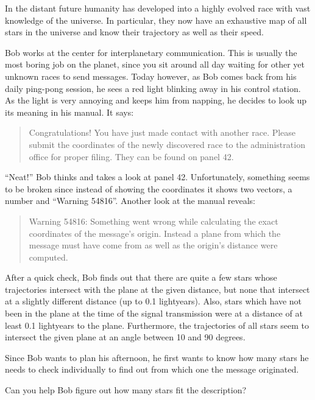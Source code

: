 
In the distant future humanity has developed into a highly evolved race with vast knowledge of the universe. In particular, they now have an exhaustive map of all stars in the universe and know their trajectory as well as their speed.

Bob works at the center for interplanetary communication. This is usually the most boring job on the planet, since you sit around all day waiting for other yet unknown races to send messages. Today however, as Bob comes back from his daily ping-pong session, he sees a red light blinking away in his control station. As the light is very annoying and keeps him from napping, he decides to look up its meaning in his manual. It says:

\begin{quote}
Congratulations! You have just made contact with another race. Please submit the coordinates of the newly discovered race to the administration office for proper filing. They can be found on panel 42.
\end{quote}

``Neat!'' Bob thinks and takes a look at panel 42. Unfortunately, something seems to be broken since instead of showing the coordinates it shows two vectors, a number and ``Warning 54816''. Another look at the manual reveals:

\begin{quote}
Warning 54816: Something went wrong while calculating the exact coordinates of the message's origin. Instead a plane from which the message must have come from as well as the origin's distance were computed.
\end{quote} 

After a quick check, Bob finds out that there are quite a few stars whose trajectories intersect with the plane at the given distance, but none that intersect at a slightly different distance (up to 0.1 lightyears). Also, stars which have not been in the plane at the time of the signal transmission were at a distance of at least 0.1 lightyears to the plane. Furthermore, the trajectories of all stars seem to intersect the given plane at an angle between 10 and 90 degrees.

Since Bob wants to plan his afternoon, he first wants to know how many stars he needs to check individually to find out from which one the message originated.

Can you help Bob figure out how many stars fit the description?

